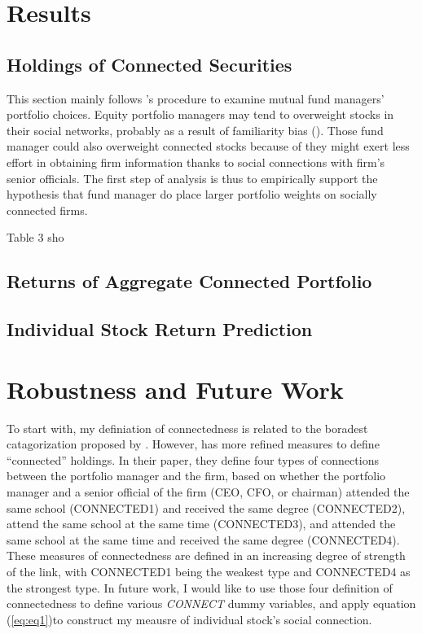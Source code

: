 \documentclass[11pt]{article}
\begin{document}
\begin{doublespace}
\section{Results}
\subsection{Holdings of Connected Securities}
This section mainly follows \cite{cohen2008small} 's procedure to examine mutual fund managers' portfolio choices. Equity portfolio managers may tend to overweight stocks in their social networks, probably as a result of familiarity bias (\cite{huberman2001familiarity}). Those fund manager could also overweight connected stocks because of they might exert less effort in obtaining firm information thanks to social connections with firm's senior officials. The first step of analysis is thus to empirically support the hypothesis that fund manager do place larger portfolio weights on socially connected firms. 

Table 3 sho





\subsection{Returns of Aggregate Connected Portfolio}

\subsection{Individual Stock Return Prediction}



\section{Robustness and Future Work}
To start with, my definiation of connectedness is related to the boradest catagorization proposed by \cite{cohen2008small}. However, \cite{cohen2008small} has more refined measures to define ``connected'' holdings. In their paper, they define four types of connections between the portfolio manager and the firm, based on whether the portfolio manager and a senior official of the firm (CEO, CFO, or chairman) attended the same school (CONNECTED1) and received the same degree (CONNECTED2), attend the same school at the same time (CONNECTED3), and attended the same school at the same time and received the same degree (CONNECTED4). These measures of connectedness are defined in an increasing degree of strength of the link, with CONNECTED1 being the weakest type and CONNECTED4 as the strongest type. In future work, I would like to use those four definition of connectedness to define various \emph{CONNECT} dummy variables, and apply equation (\ref{eq:eq1})to construct my meausre of individual stock's social connection. 





\end{doublespace}
\end{document}
